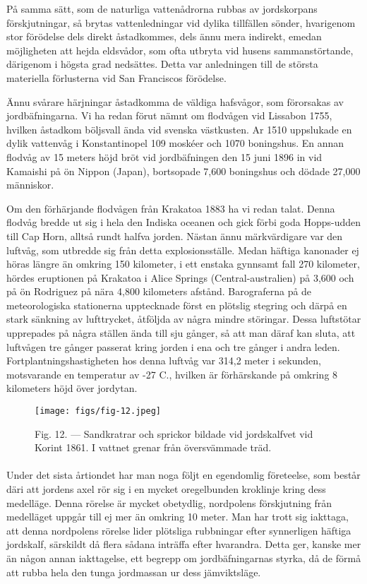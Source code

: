 \documentclass[a4paper, 12pt, oneside, swedish]{article}
\begin{document}
På samma sätt, som de naturliga vattenådrorna rubbas av jordskorpans förskjutningar, så brytas vattenledningar vid dylika tillfällen sönder, hvarigenom stor förödelse dels direkt åstadkommes, dels ännu mera indirekt, emedan möjligheten att hejda eldsvådor, som ofta utbryta vid husens sammanstörtande, därigenom i högsta grad nedsättes. Detta var anledningen till de största materiella förlusterna vid San Franciscos förödelse.

Ännu svårare härjningar åstadkomma de väldiga hafsvågor, som förorsakas av jordbäfningarna. Vi ha redan förut nämnt om flodvågen vid Lissabon 1755, hvilken åstadkom böljsvall ända vid svenska västkusten. Ar 1510 uppslukade en dylik vattenvåg i Konstantinopel 109 moskéer och 1070 boningshus. En annan flodvåg av 15 meters höjd bröt vid jordbäfningen den 15 juni 1896 in vid Kamaishi på ön Nippon (Japan), bortsopade 7,600 boningshus och dödade 27,000 människor.

Om den förhärjande flodvågen från Krakatoa 1883 ha vi redan talat. Denna flodvåg bredde ut sig i hela den Indiska oceanen och gick förbi goda Hopps-udden till Cap Horn, alltså rundt halfva jorden. Nästan ännu märkvärdigare var den luftvåg, som utbredde sig från detta explosionsställe. Medan häftiga kanonader ej höras längre än omkring 150 kilometer, i ett enstaka gynnsamt fall 270 kilometer, hördes eruptionen på Krakatoa i Alice Springs (Central-australien) på 3,600 och på ön Rodriguez på nära 4,800 kilometers afstånd. Barograferna på de meteorologiska stationerna upptecknade först en plötslig stegring och därpå en stark sänkning av lufttrycket, åtföljda av några mindre störingar. Dessa luftstötar upprepades på några ställen ända till sju gånger, så att man däraf kan sluta, att luftvågen tre gånger passerat kring jorden i ena och tre gånger i andra leden. Fortplantningshastigheten hos denna luftvåg var 314,2 meter i sekunden, motsvarande en temperatur av -27 C., hvilken är förhärskande på omkring 8 kilometers höjd över jordytan.

\begin{figure}[H]
\centering
\texttt{[image: figs/fig-12.jpeg]}
\caption{Fig. 12. --- Sandkratrar och sprickor bildade vid jordskalfvet vid Korint 1861. I vattnet grenar från översvämmade träd.}
\end{figure}
\paragraph{}
Under det sista årtiondet har man noga följt en egendomlig företeelse, som består däri att jordens axel rör sig i en mycket oregelbunden kroklinje kring dess medelläge. Denna rörelse är mycket obetydlig, nordpolens förskjutning från medelläget uppgår till ej mer än omkring 10 meter. Man har trott sig iakttaga, att denna nordpolens rörelse lider plötsliga rubbningar efter synnerligen häftiga jordskalf, särskildt då flera sådana inträffa efter hvarandra. Detta ger, kanske mer än någon annan iakttagelse, ett begrepp om jordbäfningarnas styrka, då de förmå att rubba hela den tunga jordmassan ur dess jämviktsläge.
\end{document}
